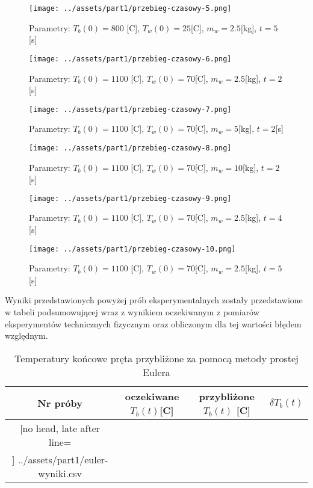 \documentclass[
	12pt, %
]{fphw}
\begin{document}
\begin{figure}[H]
	\texttt{[image: ../assets/part1/przebieg-czasowy-5.png]}
	\caption{Parametry: \(T_b(0) = 800\) [\textdegree{}C], \(T_w(0) = 25\)[\textdegree{}C], \(m_w = 2.5\)[kg], \(t = 5\)[s]}

	\texttt{[image: ../assets/part1/przebieg-czasowy-6.png]}
	\caption{Parametry: \(T_b(0) = 1100\) [\textdegree{}C], \(T_w(0) = 70\)[\textdegree{}C], \(m_w = 2.5\)[kg], \(t = 2\)[s]}
\end{figure}

\begin{figure}[H]
	\texttt{[image: ../assets/part1/przebieg-czasowy-7.png]}
	\caption{Parametry: \(T_b(0) = 1100\) [\textdegree{}C], \(T_w(0) = 70\)[\textdegree{}C], \(m_w = 5\)[kg], \(t = 2\)[s]}

	\texttt{[image: ../assets/part1/przebieg-czasowy-8.png]}
	\caption{Parametry: \(T_b(0) = 1100\) [\textdegree{}C], \(T_w(0) = 70\)[\textdegree{}C], \(m_w = 10\)[kg], \(t = 2\)[s]}
\end{figure}

\begin{figure}[H]
	\texttt{[image: ../assets/part1/przebieg-czasowy-9.png]}
	\caption{Parametry: \(T_b(0) = 1100\) [\textdegree{}C], \(T_w(0) = 70\)[\textdegree{}C], \(m_w = 2.5\)[kg], \(t = 4\)[s]}

	\texttt{[image: ../assets/part1/przebieg-czasowy-10.png]}
	\caption{Parametry: \(T_b(0) = 1100\) [\textdegree{}C], \(T_w(0) = 70\)[\textdegree{}C], \(m_w = 2.5\)[kg], \(t = 5\)[s]}
\end{figure}

Wyniki przedstawionych powyżej prób eksperymentalnych zostały przedstawione w tabeli podsumowującej
wraz z wynikiem oczekiwanym z pomiarów eksperymentów technicznych fizycznym oraz obliczonym dla tej wartości
błędem względnym.

\begin{table}[H]
	\begin{tabular}{|c|c|c|c|}\hline%
		Nr próby & oczekiwane \(T_b(t)\)[\textdegree{}C] & przybliżone \(T_b(t)\) [\textdegree{}C] & \(\delta T_b(t)\) \\\hline
		\csvreader[no head, late after line=\\\hline]%
		{../assets/part1/euler-wyniki.csv}{}%
		{\thecsvrow&\csvcoli&\csvcoliii&\csvcoliv}%
	\end{tabular}
	\caption{Temperatury końcowe pręta przybliżone za pomocą metody prostej Eulera}
	\label{tab:euler-1}
\end{table}
\end{document}
